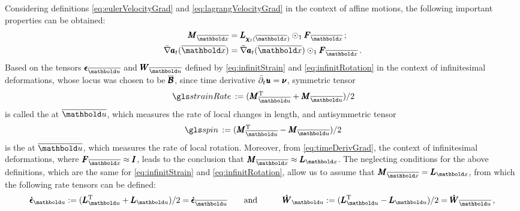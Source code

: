 Considering  definitions \eqref{eq:eulerVelocityGrad} and \eqref{eq:lagrangVelocityGrad} in the context of affine motions, the following important properties can be obtained:
\begin{equation}\label{eq:timeDerivGrad}
\begin{aligned}
\tnr{M}_{\overline{\vto{x}}}&= \tnr{L}_{\tnr{\chi}_t(\overline{\vto{x}})}\odot_1\tnr{F}_{\overline{\vto{x}}}\,;\\
\fua{\bar{\nabla}\tnr{a}_t}{\overline{\vto{x}}}&=\fua{\tilde{\nabla}\tnr{a}_t}{\overline{\vto{x}}}\odot_1\tnr{F}_{\overline{\vto{x}}}\,.
\end{aligned} 
\end{equation}
Based on the tensors $\tnr{\epsilon}_{\overline{\vto{u}}}$ and $\tnr{W}_{\overline{\vto{u}}}$ defined by \eqref{eq:infinitStrain} and \eqref{eq:infinitRotation} in the context of infinitesimal deformations, whose locus was chosen to be $\overline{\pmb{\mathcal{B}}}$, since time derivative $\bar{\partial}_t\pmb{\mathit{u}}=\pmb{\nu}$, symmetric tensor 
\begin{equation}\label{eq:infinitTimeStrain}
\gloref{strainRate}:=(\tnr{M}_{\overline{\vto{u}}}^{\text{T}}+\tnr{M}_{\overline{\vto{u}}})/2
\end{equation}
is called the  at $\overline{\vto{u}}$, which measures the rate of local changes in length,  and antisymmetric tensor
\begin{equation}\label{eq:infinitTimeSpin}
\gloref{spin}:=(\tnr{M}_{\overline{\vto{u}}}^{\text{T}}-\tnr{M}_{\overline{\vto{u}}})/2
\end{equation}
is the  at $\overline{\vto{u}}$, which measures the rate of local rotation. Moreover, from \eqref{eq:timeDerivGrad}, the context of infinitesimal deformations, where $\tnr{F}_{\overline{\vto{x}}}\approx\tnr{I}$, leads to the conclusion that $\tnr{M}_{\overline{\vto{x}}}\approx\tnr{L}_{\vto{x}}$. The neglecting conditions for the above definitions, which are the same for  \eqref{eq:infinitStrain} and \eqref{eq:infinitRotation}, allow us to assume that $\tnr{M}_{\overline{\vto{x}}}=\tnr{L}_{\vto{x}}$, from which the following rate tensors can be defined:
\begin{alignat}{3} \label{eq:equalGradVel}
\tnr{\dot{\epsilon}}_{{\vto{u}}}:=(\tnr{L}_{{\vto{u}}}^{\text{T}}+\tnr{L}_{{\vto{u}}})/2=\tnr{\dot{\epsilon}}_{\overline{\vto{u}}} &\qquad \text{and}\qquad & \tnr{\dot{W}}_{{\vto{u}}}:=(\tnr{L}_{{\vto{u}}}^{\text{T}}-\tnr{L}_{{\vto{u}}})/2=\tnr{\dot{W}}_{\overline{\vto{u}}}\,,
\end{alignat}
